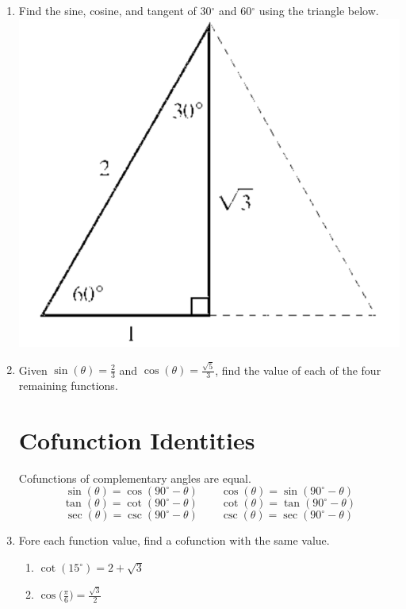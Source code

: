 \documentclass[11pt]{article}
\begin{document}
\begin{enumerate}
\item Find the sine, cosine, and tangent of 30$^{\circ}$ and  60$^{\circ}$ using the triangle below.\\
\includegraphics[scale=.6]{trigex3}\\


\newpage

\item Given $\sin(\theta)=\frac{2}{3}$ and $\cos(\theta)=\frac{\sqrt{5}}{3}$, find the value of each of the four remaining functions.\vfill
\vfill


\section{Cofunction Identities}
\noindent Cofunctions of complementary angles are equal.
$$\sin(\theta)=\cos(90^{\circ}-\theta) \quad \quad \cos(\theta)=\sin(90^{\circ}-\theta)$$
$$\tan(\theta)=\cot(90^{\circ}-\theta) \quad \quad \cot(\theta)=\tan(90^{\circ}-\theta)$$
$$\sec(\theta)=\csc(90^{\circ}-\theta) \quad \quad \csc(\theta)=\sec(90^{\circ}-\theta)$$



\item Fore each function value, find a cofunction with the same value.
\begin{enumerate}
\item $\cot(15^{\circ})=2+\sqrt{3}$\vfill
\item $\displaystyle \cos\Bigg(\frac{\pi}{6}\Bigg)=\frac{\sqrt{3}}{2}$\vfill
\end{enumerate}


\end{enumerate}
\end{document}
